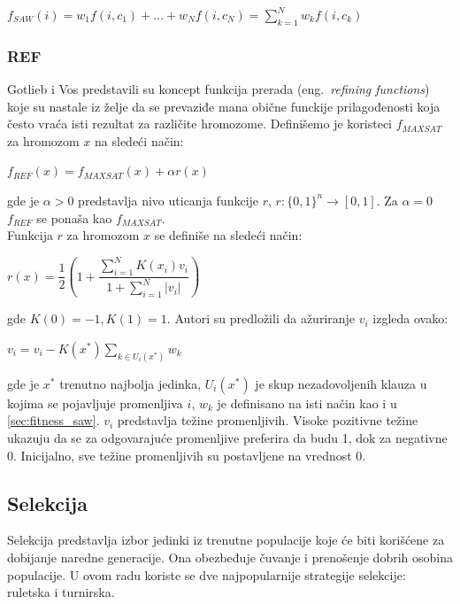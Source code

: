 \documentclass[a4paper]{article}
\begin{document}
	\begin{center}
	$ f_{SAW}(i) = w_1 f(i, c_1) + ... + w_N f(i, c_N) = \sum_{k=1}^{N} w_k f(i, c_k)	$
	\end{center}


\subsubsection{REF}
\label{sec:fitness_rfea}
Gotlieb i Vos \cite{GotVos98_f_ref} predstavili su koncept funkcija prerada 
(eng.~{\em refining functions}) koje su nastale iz želje da se prevaziđe mana obične 
funckije prilagođenosti koja često vraća isti rezultat za različite hromozome. 
Definišemo je koristeci $f_{MAXSAT}$ za hromozom $x$ na sledeći način:

\begin{center}
	$ f_{REF} (x) = f_{MAXSAT} (x) + \alpha r(x) $
\end{center}
gde je $\alpha > 0 $ predstavlja nivo uticanja funkcije $r$, 
$ r : \lbrace 0, 1 \rbrace ^ n \rightarrow [0, 1] $. 
Za $\alpha = 0 $ $f_{REF} $ se ponaša kao $f_{MAXSAT} $. \\

Funkcija $r$ za hromozom $x$ se definiše na sledeći način:

\begin{center}
$r(x) = \dfrac{1}{2} ( 1 + \dfrac{\sum_{i=1}^{N} K(x_i) v_i} {1+ \sum_{i=1}^{N} |v_i|})$
\end{center}
gde  $ K(0) = -1, K(1) = 1 $. Autori su predložili da ažuriranje $v_i$  izgleda ovako:
 
\begin{center}
	$ v_i = v_i - K(x^*) \sum_{k \in U_i(x^*)} w_k $
\end{center}
gde je $x^*$ trenutno najbolja jedinka, $U_i (x^*)$ je skup nezadovoljenih klauza 
u kojima se pojavljuje promenljiva $i$, $w_k$ je definisano na isti način kao i u
\ref{sec:fitness_saw}. $v_i$ predstavlja težine promenljivih. Visoke pozitivne težine 
ukazuju da se za odgovarajuće promenljive preferira da budu 1, dok za negativne 0. 
Inicijalno, sve težine promenljivih su postavljene na vrednost 0.


\subsection{Selekcija}
\label{sec:ea_selekcija}
Selekcija predstavlja izbor jedinki iz trenutne populacije koje će biti korišćene za dobijanje
naredne generacije. Ona obezbeđuje čuvanje i prenošenje dobrih osobina populacije. 
U ovom radu koriste se dve najpopularnije strategije selekcije: ruletska i turnirska.
\end{document}
